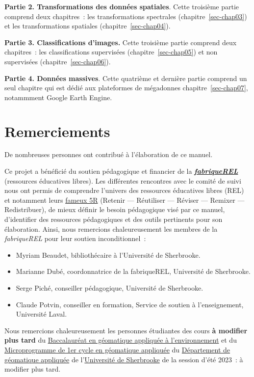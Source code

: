 \documentclass[
  letterpaper,
  DIV=11,
  numbers=noendperiod]{scrreprt}
\begin{document}
\textbf{Partie 2. Transformations des données spatiales}. Cette
troisième partie comprend deux chapitres~: les transformations
spectrales (chapitre~\ref{sec-chap03}) et les transformations spatiales
(chapitre~\ref{sec-chap04}).

\textbf{Partie 3. Classifications d'images.} Cette troisième partie
comprend deux chapitres~: les classifications supervisées
(chapitre~\ref{sec-chap05}) et non supervisées
(chapitre~\ref{sec-chap06}).

\textbf{Partie 4. Données massives}. Cette quatrième et dernière partie
comprend un seul chapitre qui est dédié aux plateformes de mégadonnes
chapitre~\ref{sec-chap07}, notammment Google Earth Engine.

\section*{Remerciements}\label{sect005}


De nombreuses personnes ont contribué à l'élaboration de ce manuel.

Ce projet a bénéficié du soutien pédagogique et financier de la
\href{https://fabriquerel.org/}{\textbf{\emph{fabriqueREL}}} (ressources
éducatives libres). Les différentes rencontres avec le comité de suivi
nous ont permis de comprendre l'univers des ressources éducatives libres
(REL) et notamment leurs \href{https://fabriquerel.org/rel/}{fameux 5R}
(Retenir --- Réutiliser --- Réviser --- Remixer --- Redistribuer), de
mieux définir le besoin pédagogique visé par ce manuel, d'identifier des
ressources pédagogiques et des outils pertinents pour son élaboration.
Ainsi, nous remercions chaleureusement les membres de la
\emph{fabriqueREL} pour leur soutien inconditionnel~:

\begin{itemize}
\item
  Myriam Beaudet, bibliothécaire à l'Université de Sherbrooke.
\item
  Marianne Dubé, coordonnatrice de la fabriqueREL, Université de
  Sherbrooke.
\item
  Serge Piché, conseiller pédagogique, Université de Sherbrooke.
\item
  Claude Potvin, conseiller en formation, Service de soutien à
  l'enseignement, Université Laval.
\end{itemize}

Nous remercions chaleureusement les personnes étudiantes des cours
\textbf{à modifier plus tard} du
\href{https://www.usherbrooke.ca/admission/programme/271/baccalaureat-en-geomatiqueappliquee-a-lenvironnement/}{Baccalauréat
en géomatique appliquée à l'environnement} et du
\href{https://www.usherbrooke.ca/admission/programme/429/microprogramme-de-1er-cycleen-geomatique-appliquee/}{Microprogramme
de 1er cycle en géomatique appliquée} du
\href{https://www.usherbrooke.ca/geomatique/}{Département de géomatique
appliquée} de l'\href{https://www.usherbrooke.ca/}{Université de
Sherbrooke} de la session d'été 2023~: à modifier plus tard.
\end{document}
